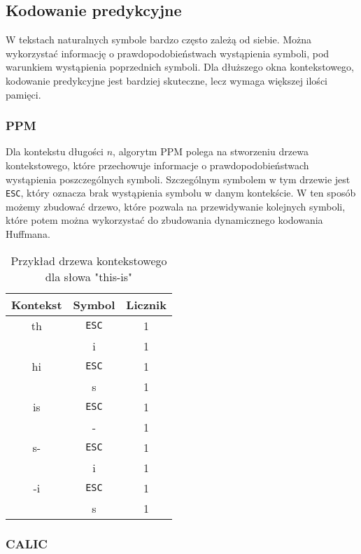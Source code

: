 \documentclass{../notatki}
\begin{document}
\subsection{Kodowanie predykcyjne}

W tekstach naturalnych symbole bardzo często zależą od siebie. Można wykorzystać
informację o prawdopodobieństwach wystąpienia symboli, pod warunkiem wystąpienia
poprzednich symboli. Dla dłuższego okna kontekstowego, kodowanie predykcyjne
jest bardziej skuteczne, lecz wymaga większej ilości pamięci.

\subsubsection{PPM}

Dla kontekstu długości $n$, algorytm PPM polega na stworzeniu drzewa
kontekstowego, które przechowuje informacje o prawdopodobieństwach wystąpienia
poszczególnych symboli. Szczególnym symbolem w tym drzewie jest \texttt{ESC},
który oznacza brak wystąpienia symbolu w danym kontekście. W ten sposób
możemy zbudować drzewo, które pozwala na przewidywanie kolejnych symboli,
które potem można wykorzystać do zbudowania dynamicznego kodowania Huffmana.

\begin{table*}[h]
  \centering
  \begin{tabular}{c|c|c}
    Kontekst & Symbol & Licznik \\
    \hline
    th & \texttt{ESC} & 1 \\
    & i & 1 \\
    \hline
    hi & \texttt{ESC} & 1 \\
    & s & 1 \\
    \hline
    is & \texttt{ESC} & 1 \\
    & - & 1 \\
    \hline
    s- & \texttt{ESC} & 1 \\
    & i & 1 \\
    \hline
    -i & \texttt{ESC} & 1 \\
    & s & 1 \\
  \end{tabular}
  \caption{Przykład drzewa kontekstowego dla słowa "this-is"}
\end{table*}

\subsubsection{CALIC}
\end{document}
